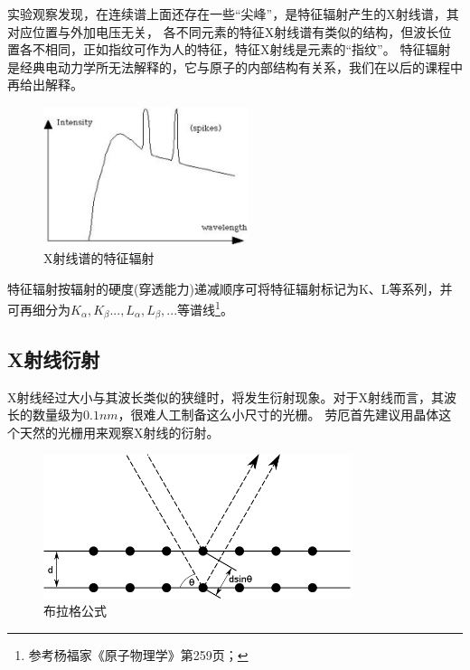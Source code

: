 实验观察发现，在连续谱上面还存在一些``尖峰''，是特征辐射产生的X射线谱，其对应位置与外加电压无关，
各不同元素的特征X射线谱有类似的结构，但波长位置各不相同，正如指纹可作为人的特征，特征X射线是元素的``指纹''。
特征辐射是经典电动力学所无法解释的，它与原子的内部结构有关系，我们在以后的课程中再给出解释。


\begin{figure}[h]
\begin{center}
\includegraphics[width=6cm]{Duality/3-4.ps}
\caption{X射线谱的特征辐射}\label{xray-spec}
\end{center}
\end{figure}

特征辐射按辐射的硬度(穿透能力)递减顺序可将特征辐射标记为K、L等系列，并可再细分为$K_\alpha  ,K_\beta  ...,L_\alpha  ,L_\beta  ,...$等谱线\footnote{参考杨福家《原子物理学》第259页；}。

\subsection{X射线衍射}


X射线经过大小与其波长类似的狭缝时，将发生衍射现象。对于X射线而言，其波长的数量级为$0.1nm$，很难人工制备这么小尺寸的光栅。
劳厄首先建议用晶体这个天然的光栅用来观察X射线的衍射。

\begin{figure}[htbp]
\begin{center}
\includegraphics[width=9cm]{Duality/BraggPlaneDiffraction.png}
\caption{布拉格公式}
\label{BraggPlaneDiffraction}
\end{center}
\end{figure}

